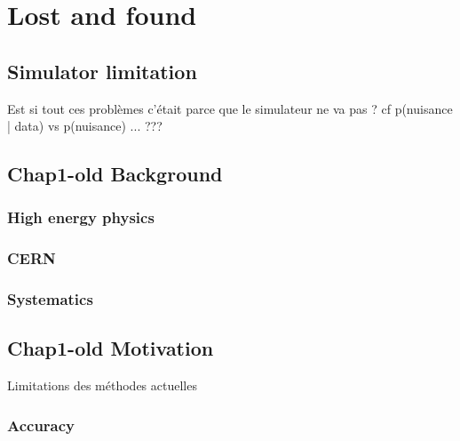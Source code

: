 
\ifpdf
    \graphicspath{{Appendix2/Figs/Raster/}{Appendix2/Figs/PDF/}{Appendix2/Figs/}}
\else
    \graphicspath{{Appendix2/Figs/Vector/}{Appendix2/Figs/}}
\fi

\chapter{Lost and found}



\section{Simulator limitation} %
\label{sec:simulator_limitation}

Est si tout ces problèmes c'était parce que le simulateur ne va pas ? cf p(nuisance | data) vs p(nuisance) ... ???

\section{Chap1-old Background}


\subsection{High energy physics} %
\label{sub:high_energy_physics}

\subsection{CERN} %
\label{sub:cern}


\subsection{Systematics} %
\label{sub:systematics}



\section{Chap1-old Motivation} %
\label{sec:motivation}

Limitations des méthodes actuelles

\subsection{Accuracy} %
\label{sub:accuracy}


